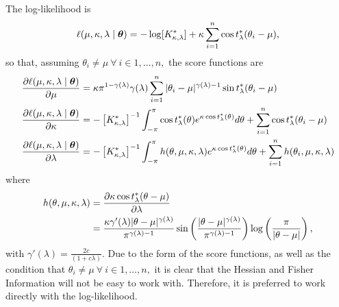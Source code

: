 The log-likelihood is
\begin{equation} \label{eqn:powbatll}
 \ell(\mu, \kappa, \lambda \mid \boldsymbol{\theta}) = -\log[K^\ast_{\kappa, \lambda}] + \kappa \sum_{i = 1}^n \cos t^\ast_\lambda(\theta_i - \mu),
\end{equation}
so that, assuming $\theta_i \neq \mu ~ \forall ~ i \in 1, \dots, n,$ the score functions are
\begin{align}
\frac{\partial  \ell(\mu, \kappa, \lambda \mid \boldsymbol{\theta})}{\partial \mu}     &=  \kappa \pi^{1 - \gamma(\lambda)} \gamma(\lambda) \sum_{i=1}^n  \vert \theta_i - \mu \vert^{\gamma(\lambda) - 1} \sin t^\ast_\lambda(\theta_i - \mu)\\
\frac{\partial  \ell(\mu, \kappa, \lambda \mid \boldsymbol{\theta})}{\partial \kappa}  &= - \left[K^\ast_{\kappa, \lambda}\right]^{-1}  \int_{-\pi}^\pi \cos t^\ast_\lambda(\theta) e^{\kappa \cos t^\ast_\lambda(\theta)} d\theta + \sum_{i=1}^n \cos t^\ast_\lambda(\theta_i - \mu)  \\
\frac{\partial  \ell(\mu, \kappa, \lambda \mid \boldsymbol{\theta})}{\partial \lambda} &= - \left[K^\ast_{\kappa, \lambda}\right]^{-1}  \int_{-\pi}^\pi h(\theta, \mu, \kappa, \lambda) e^{\kappa \cos t^\ast_\lambda(\theta)} d\theta  + \sum_{i=1}^n h(\theta_i, \mu, \kappa, \lambda)
\end{align}
where
\begin{align}
h(\theta, \mu, \kappa, \lambda) &= \frac{\partial \kappa \cos t^\ast_\lambda(\theta - \mu)}{\partial \lambda} \\ &=  \frac{ \kappa \gamma'(\lambda) \vert \theta - \mu \vert^{\gamma(\lambda)}}{\pi^{\gamma(\lambda) - 1}}  \sin \left( \frac{\vert \theta - \mu \vert^{\gamma(\lambda)}}{\pi^{\gamma(\lambda) - 1}} \right) \log\left(\frac{\pi}{\vert \theta - \mu \vert} \right),
\end{align}
with \(\gamma'(\lambda) = \frac{2c}{(1 + c \lambda)}.\) Due to the form of the score functions, as well as the condition that $\theta_i \neq \mu ~ \forall ~ i \in 1, \dots, n,$ it is clear that the Hessian and Fisher Information will not be easy to work with. Therefore, it is preferred to work directly with the log-likelihood.
